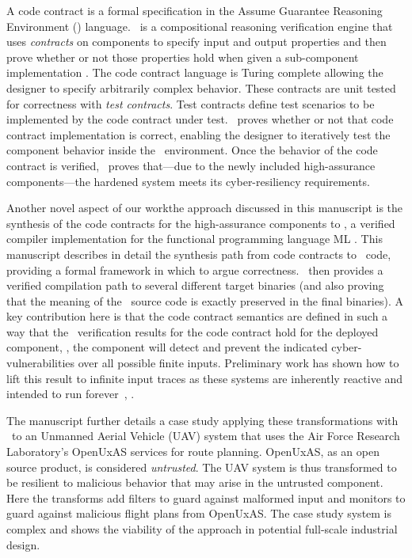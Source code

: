 A code contract is a formal specification in the Assume Guarantee
Reasoning Environment (\agr) language.
\agr\ is a compositional reasoning verification engine that uses \emph{contracts} on components to specify input and output properties and then prove whether or not those properties hold when given a sub-component implementation \cite{agree2013}.
The code contract language is Turing complete allowing the designer to
specify arbitrarily complex behavior.  These contracts are unit tested
for correctness with \emph{test contracts}.  Test contracts define
test scenarios to be implemented by the code contract under test.
\agr\ proves whether or not that code contract implementation is correct, enabling the designer to iteratively test the component behavior inside the \brfcs\ environment.
Once the behavior of the code contract is verified, \agr\ proves that---due to the newly
included high-assurance components---the hardened system meets its
cyber-resiliency requirements.

Another novel aspect of our workthe approach discussed in this manuscript is
the synthesis of the code contracts for the high-assurance components
to \ckml, a verified compiler implementation for the functional
programming language ML \cite{cakeml}.  This manuscript describes in
detail the synthesis path from code contracts to \ckml\ code,
providing a formal framework in which to argue correctness. \ckml\
then provides a verified compilation path to several different target
binaries (and also proving that the meaning of the \ckml\ source code
is exactly preserved in the final binaries).  A key contribution here
is that the code contract semantics are defined in such a way that
the \agr\ verification results for the code contract hold for the
deployed component, \ie, the component will detect and prevent the
indicated cyber-vulnerabilities over all possible finite
inputs. Preliminary work has shown how to lift this result to infinite
input traces as these systems are inherently reactive and intended to
run forever~\cite{case-verified-filter}, \cite{cakeml-space-cost}.

The manuscript further details a case study applying these
transformations with \brfcs\ to an Unmanned Aerial Vehicle (UAV)
system that uses the Air Force Research Laboratory's OpenUxAS services
for route planning.  OpenUxAS, as an open source product, is
considered \emph{untrusted}.  The UAV system is thus transformed to be
resilient to malicious behavior that may arise in the untrusted
component.  Here the transforms add filters to guard against malformed
input and monitors to guard against malicious flight plans from
OpenUxAS. The case study system is complex and shows the viability of
the approach in potential full-scale industrial design.

